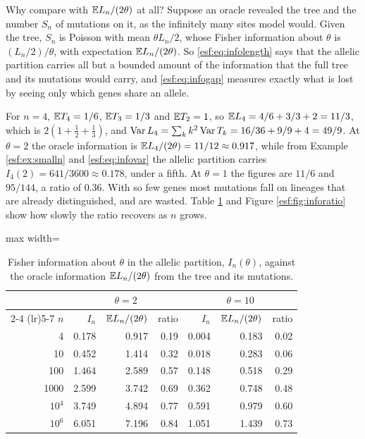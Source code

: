 Why compare with $\mathbb{E} L_n / (2\theta)$ at all? Suppose an oracle revealed the tree and
the number $S_n$ of mutations on it, as the infinitely many sites model would. Given
the tree, $S_n$ is Poisson with mean $\theta L_n/2$, whose Fisher information about
$\theta$ is $(L_n/2)/\theta$, with expectation $\mathbb{E} L_n/(2\theta)$. So
\eqref{esf:eq:infolength} says that the allelic partition carries all but a bounded
amount of the information that the full tree and its mutations would carry, and
\eqref{esf:eq:infogap} measures exactly what is lost by seeing only which genes share
an allele.

\begin{example}
\label{esf:ex:tree4}
For $n = 4$, $\mathbb{E} T_4 = 1/6$, $\mathbb{E} T_3 = 1/3$ and $\mathbb{E} T_2 = 1$, so
$\mathbb{E} L_4 = 4/6 + 3/3 + 2 = 11/3$, which is $2(1 + \tfrac12 + \tfrac13)$, and
$\operatorname{Var} L_4 = \sum_k k^{2} \operatorname{Var} T_k = 16/36 + 9/9 + 4 = 49/9$. At $\theta = 2$ the oracle
information is $\mathbb{E} L_4/(2\theta) = 11/12 \approx 0.917$, while from
Example \ref{esf:ex:smalln} and \eqref{esf:eq:infovar} the allelic partition carries
$I_4(2) = 641/3600 \approx 0.178$, under a fifth. At $\theta = 1$ the figures are
$11/6$ and $95/144$, a ratio of $0.36$. With so few genes most mutations fall on
lineages that are already distinguished, and are wasted. Table \ref{esf:tab:infogap} and
Figure \ref{esf:fig:inforatio} show how slowly the ratio recovers as $n$ grows.
\end{example}

\begin{table}[htbp]
\centering
\caption{Fisher information about $\theta$ in the allelic partition, $I_n(\theta)$,
against the oracle information $\mathbb{E} L_n/(2\theta)$ from the tree and its mutations.}
\label{esf:tab:infogap}
\begin{adjustbox}{max width=\textwidth}
\begin{tabular}{rrrrrrr}
\toprule
& \multicolumn{3}{c}{$\theta = 2$} & \multicolumn{3}{c}{$\theta = 10$} \\
\cmidrule(lr){2-4} \cmidrule(lr){5-7}
$n$ & $I_n$ & $\mathbb{E} L_n/(2\theta)$ & ratio & $I_n$ & $\mathbb{E} L_n/(2\theta)$ & ratio \\
\midrule
4        & 0.178 & 0.917 & 0.19 & 0.004 & 0.183 & 0.02 \\
10       & 0.452 & 1.414 & 0.32 & 0.018 & 0.283 & 0.06 \\
100      & 1.464 & 2.589 & 0.57 & 0.148 & 0.518 & 0.29 \\
1000     & 2.599 & 3.742 & 0.69 & 0.362 & 0.748 & 0.48 \\
$10^{4}$ & 3.749 & 4.894 & 0.77 & 0.591 & 0.979 & 0.60 \\
$10^{6}$ & 6.051 & 7.196 & 0.84 & 1.051 & 1.439 & 0.73 \\
\bottomrule
\end{tabular}
\end{adjustbox}
\end{table}

